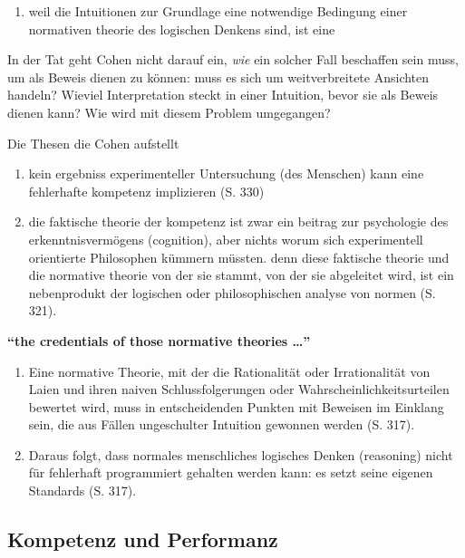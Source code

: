 \documentclass[ngerman,12pt, titlepage, smallheadings, nomath]{scrartcl}
\providecommand{\tightlist}{%
  \setlength{\itemsep}{0pt}\setlength{\parskip}{0pt}}
\begin{document}
\begin{enumerate}
\def\labelenumi{\arabic{enumi}.}
\setcounter{enumi}{3}
\tightlist
\item
  weil die Intuitionen zur Grundlage eine notwendige Bedingung einer
  normativen theorie des logischen Denkens sind, ist eine
\end{enumerate}

In der Tat geht Cohen nicht darauf ein, \emph{wie} ein solcher Fall
beschaffen sein muss, um als Beweis dienen zu können: muss es sich um
weitverbreitete Ansichten handeln? Wieviel Interpretation steckt in
einer Intuition, bevor sie als Beweis dienen kann? Wie wird mit diesem
Problem umgegangen?

Die Thesen die Cohen aufstellt

\begin{enumerate}
\def\labelenumi{\arabic{enumi}.}
\item
  kein ergebniss experimenteller Untersuchung (des Menschen) kann eine
  fehlerhafte kompetenz implizieren (S. 330)
\item
  die faktische theorie der kompetenz ist zwar ein beitrag zur
  psychologie des erkenntnisvermögens (cognition), aber nichts worum
  sich experimentell orientierte Philosophen kümmern müssten. denn diese
  faktische theorie und die normative theorie von der sie stammt, von
  der sie abgeleitet wird, ist ein nebenprodukt der logischen oder
  philosophischen analyse von normen (S. 321).
\end{enumerate}

\textbf{\enquote{the credentials of those normative theories \ldots{}}}

\begin{enumerate}
\def\labelenumi{\arabic{enumi}.}
\setcounter{enumi}{2}
\item
  Eine normative Theorie, mit der die Rationalität oder Irrationalität
  von Laien und ihren naiven Schlussfolgerungen oder
  Wahrscheinlichkeitsurteilen bewertet wird, muss in entscheidenden
  Punkten mit Beweisen im Einklang sein, die aus Fällen ungeschulter
  Intuition gewonnen werden (S. 317).
\item
  Daraus folgt, dass normales menschliches logisches Denken (reasoning)
  nicht für fehlerhaft programmiert gehalten werden kann: es setzt seine
  eigenen Standards (S. 317).
\end{enumerate}

\subsection{Kompetenz und Performanz}\label{kompetenz-und-performanz}
\end{document}

